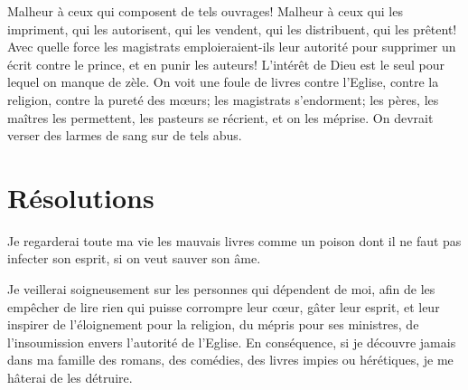 \documentclass[instructions.tex]{subfiles}
\begin{document}
Malheur à ceux qui composent de tels ouvrages! Malheur à ceux qui les impriment, qui les autorisent, qui les vendent, qui les distribuent, qui les prêtent! Avec quelle force les magistrats emploieraient-ils leur autorité pour supprimer un écrit contre le prince, et en punir les auteurs! L'intérêt de Dieu est le seul pour lequel on manque de zèle. On voit une foule de livres contre l'Eglise, contre la religion, contre la pureté des mœurs; les magistrats s'endorment; les pères, les maîtres les permettent, les pasteurs se récrient, et on les méprise. On devrait verser des larmes de sang sur de tels abus.
 
\section{Résolutions}
 
\primo Je regarderai toute ma vie les mauvais livres comme un poison dont il ne faut pas infecter son esprit, si on veut sauver son âme. 

\secundo Je veillerai soigneusement sur les personnes qui dépendent de moi, afin de les empêcher de lire rien qui puisse corrompre leur cœur, gâter leur esprit, et leur inspirer de l'éloignement pour la religion, du mépris pour ses ministres, de l'insoumission envers l'autorité de l'Eglise. 
\tertio En conséquence, si je découvre jamais dans ma famille des romans, des comédies, des livres impies ou hérétiques, je me hâterai de les détruire. 

 
\end{document}
